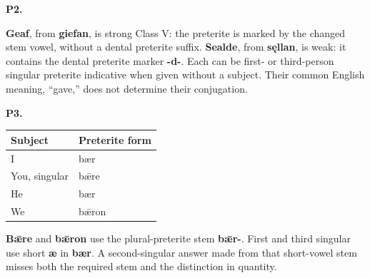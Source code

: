 \par\begin{minipage}{\linewidth}\raggedright
\textbf{P2.}

\textbf{Geaf}, from \textbf{giefan}, is strong Class V: the preterite is marked by the changed stem vowel, without a dental preterite suffix. \textbf{Sealde}, from \textbf{sęllan}, is weak: it contains the dental preterite marker \textbf{-d-}. Each can be first- or third-person singular preterite indicative when given without a subject. Their common English meaning, “gave,” does not determine their conjugation.

\end{minipage}\par\addvspace{4pt}

\par\begin{minipage}{\linewidth}\raggedright
\textbf{P3.}

\par\begingroup
\fontsize{10.5}{13.2}\selectfont
\setlength{\LTleft}{0pt}\setlength{\LTright}{\fill}
\noindent
\begin{tabular}{@{}>{\raggedright\arraybackslash}p{57.78mm}>{\raggedright\arraybackslash}p{63.41mm}@{}}
\toprule
\textbf{Subject} & \textbf{Preterite form} \\
\midrule
I & bær \\
You, singular & bǣre \\
He & bær \\
We & bǣron \\
\bottomrule
\end{tabular}
\par\endgroup

\textbf{Bǣre} and \textbf{bǣron} use the plural-preterite stem \textbf{bǣr-}. First and third singular use short \textbf{æ} in \textbf{bær}. A second-singular answer made from that short-vowel stem misses both the required stem and the distinction in quantity.

\end{minipage}\par\addvspace{4pt}

